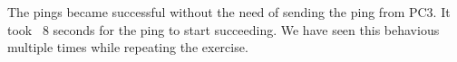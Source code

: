 The pings became successful without the need of sending the ping from PC3.
It took ~8 seconds for the ping to start succeeding.
We have seen this behavious multiple times while repeating the exercise.